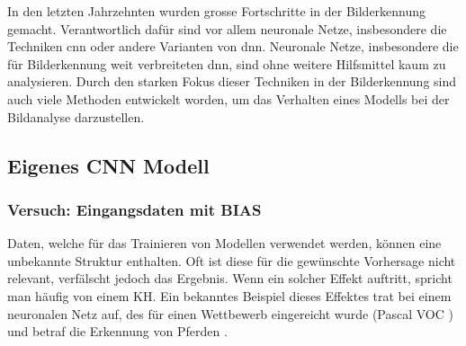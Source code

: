 \documentclass[
  12pt, %
  a4paper, %
  oneside, %
  openany, 
  numbers=noenddot, %
  BCOR=5mm, %
  parskip=half*, %
  thesis, %
]{bfhbook}
\begin{document}
In den letzten Jahrzehnten wurden grosse Fortschritte in der Bilderkennung gemacht. Verantwortlich dafür sind vor allem neuronale Netze, insbesondere die Techniken \acrfull{cnn} oder andere Varianten von \acrfull{dnn}. Neuronale Netze, insbesondere die für Bilderkennung weit verbreiteten \acrshort{dnn}, sind ohne weitere Hilfsmittel kaum zu analysieren.
Durch den starken Fokus dieser Techniken in der Bilderkennung sind auch viele Methoden entwickelt worden, um das Verhalten eines Modells  bei der Bildanalyse darzustellen.

\subsection{Eigenes CNN Modell}

\subsubsection*{Versuch: Eingangsdaten mit BIAS}
Daten, welche für das Trainieren von  Modellen verwendet werden, können eine unbekannte Struktur enthalten. Oft ist diese für die gewünschte Vorhersage nicht relevant, verfälscht jedoch das  Ergebnis. Wenn ein solcher Effekt auftritt, spricht man häufig von einem \Gls{KH}. Ein bekanntes Beispiel dieses Effektes trat bei einem neuronalen Netz auf, des für einen Wettbewerb eingereicht wurde (Pascal VOC \cite{Everingham_thepascal}) und betraf die Erkennung von Pferden \parencite{Lapuschkin2019}. 
\end{document}
